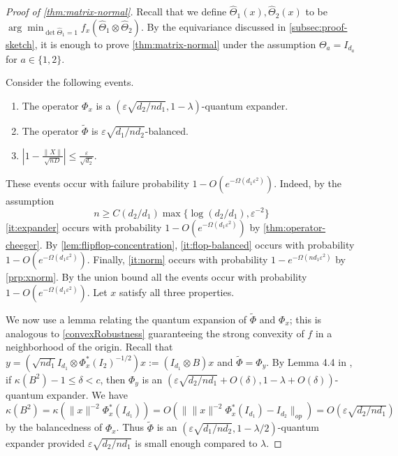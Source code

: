 \documentclass[aos]{imsart}
\theoremstyle{definition}
\numberwithin{equation}{section}
\newcommand{\htheta}{\widehat{\Theta}}
\newcommand{\ot}{\otimes}
\newcommand{\eps}{\varepsilon}
\newcommand{\samp}{x}
\newcommand{\rv}{x}
\begin{document}
\begin{proof}[Proof of \cref{thm:matrix-normal}]
Recall that we define $\htheta_1(\samp), \htheta_2(\samp)$ to be $\arg\min_{\det \htheta_1 = 1} f_\samp(\htheta_1 \ot \htheta_2)$. By the equivariance discussed in \cref{subsec:proof-sketch}, it is enough to prove \cref{thm:matrix-normal} under the assumption $\Theta_a = I_{d_a}$ for $a \in \{1,2\}$.

Consider the following events.
\begin{enumerate}
\item\label{it:expander} The operator $\Phi_{\rv}$ is a $(\eps  \sqrt{{d_2}/{n d_1}},1-\lambda)$-quantum expander.
\item\label{it:flop-balanced} The operator $\tilde{\Phi}$ is $\eps \sqrt{{d_1}/{n d_2}}$-balanced.
\item \label{it:norm} $|1 - \frac{\|X\|}{\sqrt{nD}}| \leq \frac{\eps}{\sqrt{d_2}}. $
\end{enumerate}
These events occur with failure probability $1 - O(e^{ - \Omega( d_1 \eps^2)}).$ Indeed, by the assumption
$$n \geq C (d_2/d_1) \max\{\log (d_2/d_1),  \eps^{-2}\} $$
\cref{it:expander} occurs with probability $1 - O(e^{ - \Omega( d_1 \eps^2)})$ by \cref{thm:operator-cheeger}. By \cref{lem:flipflop-concentration}, \cref{it:flop-balanced} occurs with probability $1 - O(e^{ - \Omega( d_1 \eps^2)}).$ Finally, \cref{it:norm} occurs with probability $1 - e^{- \Omega(n d_1 \eps^2)}$ by \cref{prp:xnorm}. By the union bound all the events occur with probability $1 - O(e^{ - \Omega( d_1 \eps^2)})$. Let $\samp$ satisfy all three properties.

We now use a lemma relating the quantum expansion of $\tilde{\Phi}$ and $\Phi_\samp$; this is analogous to \cref{convexRobustness} guaranteeing the strong convexity of $f$ in a neighborhood of the origin. Recall that $y = (\sqrt{ nd_1} I_{d_1} \ot \Phi_x^*(I_2)^{-1/2}) x:= (I_{d_1} \ot B)x$ and $\tilde{\Phi} = \Phi_y$. By Lemma 4.4 in \cite{FM20}, if $\kappa(B^2) - 1 \leq \delta < c$,  then $\Phi_y$ is an $(\eps \sqrt{d_2/n d_1} + O(\delta), 1 - \lambda + O(\delta))$-quantum expander. We have $\kappa(B^2) = \kappa(\|x\|^{-2} \Phi_\samp^*(I_{d_1})) = O(\|\|x\|^{-2} \Phi_\samp^*(I_{d_1}) - I_{d_2}\|_{op}) = O(\eps \sqrt{d_2/nd_1})$ by the balancedness of $\Phi_x$. Thus $\tilde{\Phi}$ is an $(\eps \sqrt{d_1 / n d_2}, 1 - \lambda/2)$-quantum expander provided $\eps \sqrt{d_2/nd_1}$ is small enough compared to $\lambda$.


\end{proof}
\end{document}
